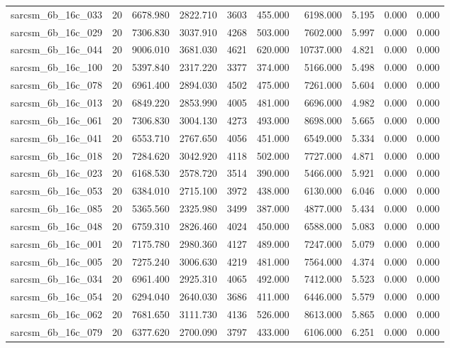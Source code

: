 \begin{tabular}{lrrrrrrrrr}
sarcsm\_6b\_16c\_033 & 20 & 6678.980 & 2822.710 & 3603 & 455.000 & 6198.000 & 5.195 & 0.000 & 0.000 \\
sarcsm\_6b\_16c\_029 & 20 & 7306.830 & 3037.910 & 4268 & 503.000 & 7602.000 & 5.997 & 0.000 & 0.000 \\
sarcsm\_6b\_16c\_044 & 20 & 9006.010 & 3681.030 & 4621 & 620.000 & 10737.000 & 4.821 & 0.000 & 0.000 \\
sarcsm\_6b\_16c\_100 & 20 & 5397.840 & 2317.220 & 3377 & 374.000 & 5166.000 & 5.498 & 0.000 & 0.000 \\
sarcsm\_6b\_16c\_078 & 20 & 6961.400 & 2894.030 & 4502 & 475.000 & 7261.000 & 5.604 & 0.000 & 0.000 \\
sarcsm\_6b\_16c\_013 & 20 & 6849.220 & 2853.990 & 4005 & 481.000 & 6696.000 & 4.982 & 0.000 & 0.000 \\
sarcsm\_6b\_16c\_061 & 20 & 7306.830 & 3004.130 & 4273 & 493.000 & 8698.000 & 5.665 & 0.000 & 0.000 \\
sarcsm\_6b\_16c\_041 & 20 & 6553.710 & 2767.650 & 4056 & 451.000 & 6549.000 & 5.334 & 0.000 & 0.000 \\
sarcsm\_6b\_16c\_018 & 20 & 7284.620 & 3042.920 & 4118 & 502.000 & 7727.000 & 4.871 & 0.000 & 0.000 \\
sarcsm\_6b\_16c\_023 & 20 & 6168.530 & 2578.720 & 3514 & 390.000 & 5466.000 & 5.921 & 0.000 & 0.000 \\
sarcsm\_6b\_16c\_053 & 20 & 6384.010 & 2715.100 & 3972 & 438.000 & 6130.000 & 6.046 & 0.000 & 0.000 \\
sarcsm\_6b\_16c\_085 & 20 & 5365.560 & 2325.980 & 3499 & 387.000 & 4877.000 & 5.434 & 0.000 & 0.000 \\
sarcsm\_6b\_16c\_048 & 20 & 6759.310 & 2826.460 & 4024 & 450.000 & 6588.000 & 5.083 & 0.000 & 0.000 \\
sarcsm\_6b\_16c\_001 & 20 & 7175.780 & 2980.360 & 4127 & 489.000 & 7247.000 & 5.079 & 0.000 & 0.000 \\
sarcsm\_6b\_16c\_005 & 20 & 7275.240 & 3006.630 & 4219 & 481.000 & 7564.000 & 4.374 & 0.000 & 0.000 \\
sarcsm\_6b\_16c\_034 & 20 & 6961.400 & 2925.310 & 4065 & 492.000 & 7412.000 & 5.523 & 0.000 & 0.000 \\
sarcsm\_6b\_16c\_054 & 20 & 6294.040 & 2640.030 & 3686 & 411.000 & 6446.000 & 5.579 & 0.000 & 0.000 \\
sarcsm\_6b\_16c\_062 & 20 & 7681.650 & 3111.730 & 4136 & 526.000 & 8613.000 & 5.865 & 0.000 & 0.000 \\
sarcsm\_6b\_16c\_079 & 20 & 6377.620 & 2700.090 & 3797 & 433.000 & 6106.000 & 6.251 & 0.000 & 0.000 \\

\end{tabular}
